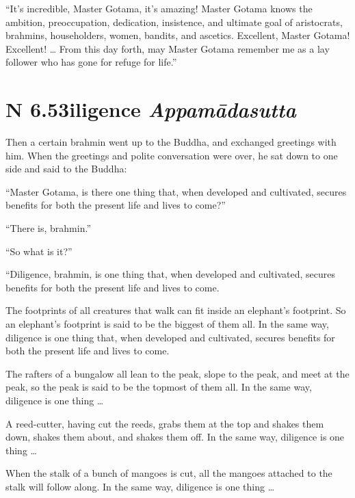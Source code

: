 \documentclass[12pt,openany]{book}%
\newcommand*{\suttatitleacronym}[1]{\smaller[2]{#1}\vspace*{.3em}}
\newcommand*{\suttatitletranslation}[1]{\linebreak{#1}}
\newcommand*{\suttatitleroot}[1]{\linebreak\smaller[2]\itshape{#1}}
\newcommand*{\tocacronym}[1]{\hspace*{-3.3em}{#1}\quad}
\newcommand*{\toctranslation}[1]{#1}
\newcommand*{\tocroot}[1]{(\textit{#1})}
\begin{document}
“It’s incredible, Master Gotama, it’s amazing! Master Gotama knows the ambition, preoccupation, dedication, insistence, and ultimate goal of aristocrats, brahmins, householders, women, bandits, and ascetics. Excellent, Master Gotama! Excellent! … From this day forth, may Master Gotama remember me as a lay follower who has gone for refuge for life.” 

%
\section*{{\suttatitleacronym AN 6.53}{\suttatitletranslation Diligence }{\suttatitleroot Appamādasutta}}
\addcontentsline{toc}{section}{\tocacronym{AN 6.53} \toctranslation{Diligence } \tocroot{Appamādasutta}}

Then a certain brahmin went up to the Buddha, and exchanged greetings with him. When the greetings and polite conversation were over, he sat down to one side and said to the Buddha: 

“Master Gotama, is there one thing that, when developed and cultivated, secures benefits for both the present life and lives to come?” 

“There is, brahmin.” 

“So what is it?” 

“Diligence, brahmin, is one thing that, when developed and cultivated, secures benefits for both the present life and lives to come. 

The footprints of all creatures that walk can fit inside an elephant’s footprint. So an elephant’s footprint is said to be the biggest of them all. In the same way, diligence is one thing that, when developed and cultivated, secures benefits for both the present life and lives to come. 

The rafters of a bungalow all lean to the peak, slope to the peak, and meet at the peak, so the peak is said to be the topmost of them all. In the same way, diligence is one thing … 

A reed-cutter, having cut the reeds, grabs them at the top and shakes them down, shakes them about, and shakes them off. In the same way, diligence is one thing … 

When the stalk of a bunch of mangoes is cut, all the mangoes attached to the stalk will follow along. In the same way, diligence is one thing … 
\end{document}
